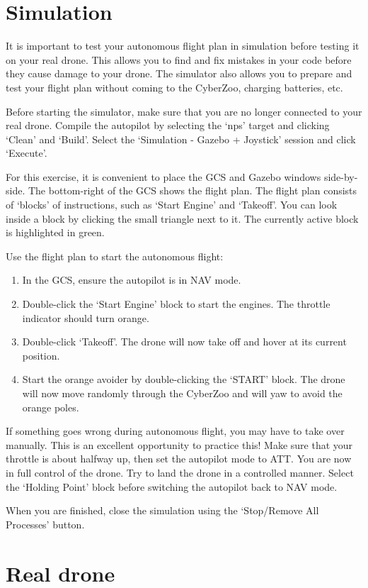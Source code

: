 \section{Simulation}
It is important to test your autonomous flight plan in simulation before testing it on your real drone. This allows you to find and fix mistakes in your code before they cause damage to your drone. The simulator also allows you to prepare and test your flight plan without coming to the CyberZoo, charging batteries, etc.

Before starting the simulator, make sure that you are no longer connected to your real drone.
Compile the autopilot by selecting the `nps' target and clicking `Clean' and `Build'. Select the `Simulation - Gazebo + Joystick' session and click `Execute'.

For this exercise, it is convenient to place the GCS and Gazebo windows side-by-side.
The bottom-right of the GCS shows the flight plan. The flight plan consists of `blocks' of instructions, such as `Start Engine' and `Takeoff'. You can look inside a block by clicking the small triangle next to it. The currently active block is highlighted in green.

Use the flight plan to start the autonomous flight:
\begin{enumerate}
	\item In the GCS, ensure the autopilot is in NAV mode.
	\item Double-click the `Start Engine' block to start the engines. The throttle indicator should turn orange.
	\item Double-click `Takeoff'. The drone will now take off and hover at its current position.
	\item Start the orange avoider by double-clicking the `START' block. The drone will now move randomly through the CyberZoo and will yaw to avoid the orange poles.
\end{enumerate}

If something goes wrong during autonomous flight, you may have to take over manually. This is an excellent opportunity to practice this!
Make sure that your throttle is about halfway up, then set the autopilot mode to ATT. You are now in full control of the drone. Try to land the drone in a controlled manner. Select the `Holding Point' block before switching the autopilot back to NAV mode.

When you are finished, close the simulation using the `Stop/Remove All Processes' button.

\section{Real drone}
